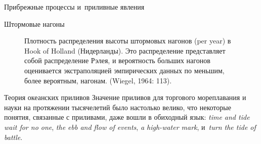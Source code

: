 \begin{chapter}{Прибрежные процессы и~приливные явления}
\begin{section}{Штормовые нагоны}
\begin{figure}[t!]
\caption{Плотность распределения высоты штормовых нагонов (per year)
в Hook of Holland (Нидерланды). Это распределение представляет собой
распределение Рэлея, и вероятность больших нагонов оценивается экстраполяцией
эмпирических данных по меньшим, более вероятным, нагонам.
(Wiegel, 1964: 113).}
\label{fig:surgeprob}
\end{figure}
%
\end{section}

\begin{section}{Теория океанских приливов}
Значение приливов для торгового мореплавания и науки
на протяжении тысячелетий было настолько велико, что некоторые понятия,
связанные с приливами, даже вошли в обиходный язык:
\textit{time and tide wait for no one}, 
\textit{the ebb and flow of events}, 
\textit{a high-water mark}, 
и~\textit{turn the tide of battle}.
%


\end{section}
\end{chapter}
